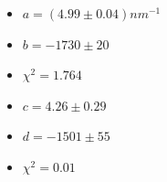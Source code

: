\documentclass{article}
\begin{document}
\begin{center}
\begin{minipage}{0.45\textwidth}
        \label{grafico:13.2}
    \end{minipage}
    \hfill %
\end{center}

\begin{center}
    \begin{minipage}{0.4\textwidth}
        \begin{itemize}
            \item $a=(4.99\pm0.04) nm^{-1}$
            \item $b=-1730\pm20$
            \item $\chi^2=1.764$
        \end{itemize}
    \end{minipage}
    \hfill
    \begin{minipage}{0.4\textwidth}
        \begin{itemize}
            \item $c=4.26\pm0.29$
            \item $d=-1501\pm55$
            \item $\chi^2=0.01$
        \end{itemize}
    \end{minipage}
\end{center}
\end{document}
